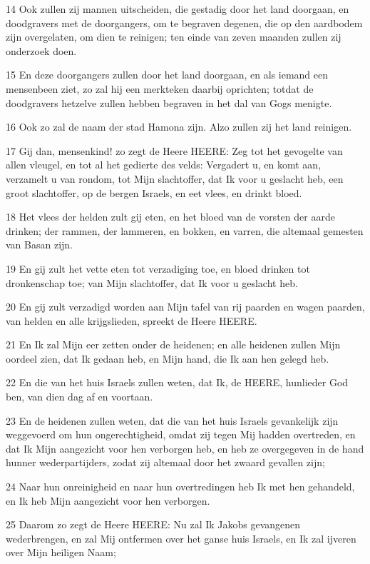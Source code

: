 \par 14 Ook zullen zij mannen uitscheiden, die gestadig door het land doorgaan, en doodgravers met de doorgangers, om te begraven degenen, die op den aardbodem zijn overgelaten, om dien te reinigen; ten einde van zeven maanden zullen zij onderzoek doen.
\par 15 En deze doorgangers zullen door het land doorgaan, en als iemand een mensenbeen ziet, zo zal hij een merkteken daarbij oprichten; totdat de doodgravers hetzelve zullen hebben begraven in het dal van Gogs menigte.
\par 16 Ook zo zal de naam der stad Hamona zijn. Alzo zullen zij het land reinigen.
\par 17 Gij dan, mensenkind! zo zegt de Heere HEERE: Zeg tot het gevogelte van allen vleugel, en tot al het gedierte des velds: Vergadert u, en komt aan, verzamelt u van rondom, tot Mijn slachtoffer, dat Ik voor u geslacht heb, een groot slachtoffer, op de bergen Israels, en eet vlees, en drinkt bloed.
\par 18 Het vlees der helden zult gij eten, en het bloed van de vorsten der aarde drinken; der rammen, der lammeren, en bokken, en varren, die altemaal gemesten van Basan zijn.
\par 19 En gij zult het vette eten tot verzadiging toe, en bloed drinken tot dronkenschap toe; van Mijn slachtoffer, dat Ik voor u geslacht heb.
\par 20 En gij zult verzadigd worden aan Mijn tafel van rij paarden en wagen paarden, van helden en alle krijgslieden, spreekt de Heere HEERE.
\par 21 En Ik zal Mijn eer zetten onder de heidenen; en alle heidenen zullen Mijn oordeel zien, dat Ik gedaan heb, en Mijn hand, die Ik aan hen gelegd heb.
\par 22 En die van het huis Israels zullen weten, dat Ik, de HEERE, hunlieder God ben, van dien dag af en voortaan.
\par 23 En de heidenen zullen weten, dat die van het huis Israels gevankelijk zijn weggevoerd om hun ongerechtigheid, omdat zij tegen Mij hadden overtreden, en dat Ik Mijn aangezicht voor hen verborgen heb, en heb ze overgegeven in de hand hunner wederpartijders, zodat zij altemaal door het zwaard gevallen zijn;
\par 24 Naar hun onreinigheid en naar hun overtredingen heb Ik met hen gehandeld, en Ik heb Mijn aangezicht voor hen verborgen.
\par 25 Daarom zo zegt de Heere HEERE: Nu zal Ik Jakobs gevangenen wederbrengen, en zal Mij ontfermen over het ganse huis Israels, en Ik zal ijveren over Mijn heiligen Naam;
